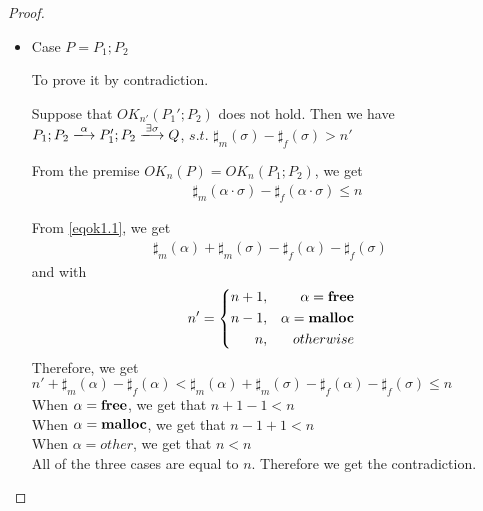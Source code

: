 \begin{proof}
\begin{itemize}
\item Case $P = P_{1};P_{2}$

To prove it by contradiction.

Suppose that $OK_{n'}(P_{1}';P_{2})$ does not hold. Then we have 
$P_{1};P_{2} \xlongrightarrow{\alpha} P_{1}';P_{2} \xlongrightarrow{\exists \sigma} Q$, $s.t.$ $\sharp_{m}(\sigma) - \sharp_{f}(\sigma) > n'$

From the premise $OK_{n}(P) = OK_{n}(P_{1};P_{2})$, we get 
\setcounter{equation}{0}
\begin{align}
  &  \sharp_{m}(\alpha \cdot \sigma) - \sharp_{f}(\alpha \cdot \sigma) \le n \label{eqok1.1}
\end{align}

From \eqref{eqok1.1}, we get
\begin{align}
\sharp_{m}(\alpha) + \sharp_{m}(\sigma) - \sharp_{f}(\alpha) - \sharp_{f}(\sigma) \  \label{eqok1.2}
\end{align}
and with
$$
   n'=\left\{
   \begin{aligned}
     n + 1, && \alpha = \mathbf{free} \\
     n - 1,  && \alpha = \mathbf{malloc}  \\
     n ,      && otherwise
   \end{aligned}
   \right.
$$
Therefore, we get \\
$n' + \sharp_{m}(\alpha) - \sharp_{f}(\alpha) < \sharp_{m}(\alpha) + \sharp_{m}(\sigma) - \sharp_{f}(\alpha) - \sharp_{f}(\sigma) \le n $ \\
When $\alpha = \mathbf{free}$, we get that $n + 1 - 1 < n$\\
When $\alpha = \mathbf{malloc}$, we get that $ n - 1 + 1 < n $ \\
When $ \alpha = other$,  we  get that $ n < n $ \\
 All of the three cases are equal to $n$. Therefore we get the contradiction.

\end{itemize}
\end{proof}

